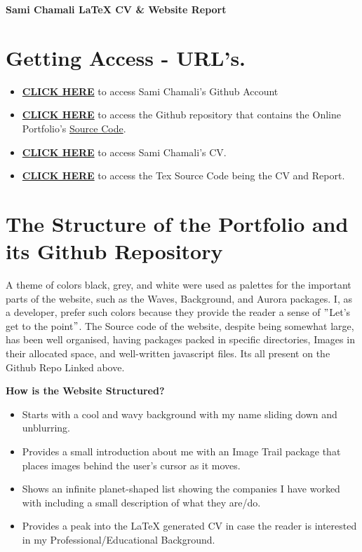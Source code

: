 \documentclass[12pt, letterpaper]{article}
\begin{document}
    \begin{center}
        \textbf{Sami Chamali LaTeX CV \& Website Report}


    \end{center}
    \section{Getting Access - URL's.}
    \begin{itemize}
        \item \textbf{\href{https://github.com/samichamali}{CLICK HERE}} to access Sami Chamali's Github Account
        \item \textbf{\href{https://github.com/samichamali/portfolio}{CLICK HERE}} to access the Github repository that contains the Online Portfolio's \underline{Source Code}.
        \item \textbf{\href{https://samichamali.github.io/portfolio/Images/CV.pdf}{CLICK HERE}} to access Sami Chamali's CV.
        \item \textbf{\href{https://github.com/samichamali/portfolio/tree/main/CV%20and%20Report%20Tex%20Files}{CLICK HERE}} to access the Tex Source Code being the CV and Report.
    \end{itemize}

    \section{The Structure of the Portfolio and its Github Repository}
    A theme of colors black, grey, and white were used as palettes for the important parts of the website, such as the Waves, Background, and Aurora packages. I, as a developer, prefer such colors because they provide the reader a sense of \("\)Let's get to the point\("\).
    The Source code of the website, despite being somewhat large, has been well organised, having packages packed in specific directories, Images in their allocated space, and well-written javascript files. Its all present on the Github Repo Linked above.
    \par \textbf{How is the Website Structured?}
    \begin{itemize}
        \item Starts with a cool and wavy background with my name sliding down and unblurring.
        \item Provides a small introduction about me with an Image Trail package that places images behind the user's cursor as it moves.
        \item Shows an infinite planet-shaped list showing the companies I have worked with including a small description of what they are/do.
        \item Provides a peak into the LaTeX generated CV in case the reader is interested in my Professional/Educational Background.
    \end{itemize}
\end{document}

